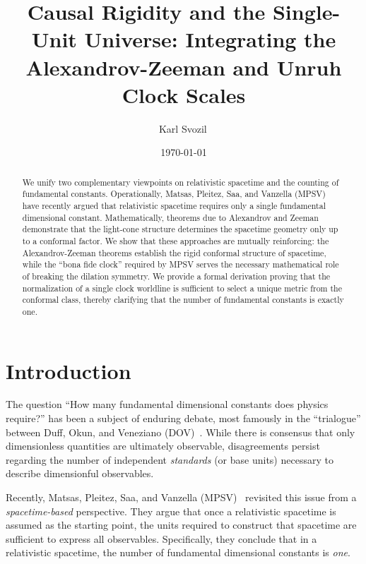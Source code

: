 \documentclass[aps,prd,twocolumn,nofootinbib,superscriptaddress]{revtex4-2}
\begin{document}
\title{Causal Rigidity and the Single-Unit Universe: Integrating the Alexandrov-Zeeman and Unruh Clock Scales}

\author{Karl Svozil\,}


\date{\today}

\begin{abstract}
We unify two complementary viewpoints on relativistic spacetime and the counting of fundamental constants. Operationally, Matsas, Pleitez, Saa, and Vanzella (MPSV) have recently argued that relativistic spacetime requires only a single fundamental dimensional constant. Mathematically, theorems due to Alexandrov and Zeeman demonstrate that the light-cone structure determines the spacetime geometry only up to a conformal factor. We show that these approaches are mutually reinforcing: the Alexandrov-Zeeman theorems establish the rigid conformal structure of spacetime, while the ``bona fide clock'' required by MPSV serves the necessary mathematical role of breaking the dilation symmetry. We provide a formal derivation proving that the normalization of a single clock worldline is sufficient to select a unique metric from the conformal class, thereby clarifying that the number of fundamental constants is exactly one.
\end{abstract}

\maketitle

\section{Introduction}

The question ``How many fundamental dimensional constants does physics require?'' has been a subject of enduring debate, most famously in the ``trialogue'' between Duff, Okun, and Veneziano (DOV)~\cite{DuffOkunVeneziano}. While there is consensus that only dimensionless quantities are ultimately observable, disagreements persist regarding the number of independent \emph{standards} (or base units) necessary to describe dimensionful observables.

Recently, Matsas, Pleitez, Saa, and Vanzella (MPSV)~\cite{matsas-2024} revisited this issue from a \emph{spacetime-based} perspective. They argue that once a relativistic spacetime is assumed as the starting point, the units required to construct that spacetime are sufficient to express all observables. Specifically, they conclude that in a relativistic spacetime, the number of fundamental dimensional constants is \emph{one}.
\end{document}
